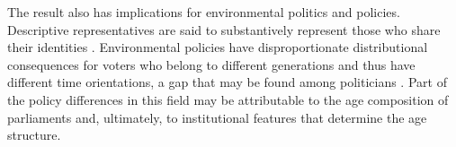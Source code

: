 \documentclass[a4paper, 12pt]{article}
\begin{document}
The result also has implications for environmental politics and policies. Descriptive representatives are said to substantively represent those who share their identities \citep{mcclean2021does}. Environmental policies have disproportionate distributional consequences for voters who belong to different generations and thus have different time orientations, a gap that may be found among politicians \citep{umeda_politics_2022}. Part of the policy differences in this field may be attributable to the age composition of parliaments and, ultimately, to institutional features that determine the age structure. 

\newpage



\end{document}
